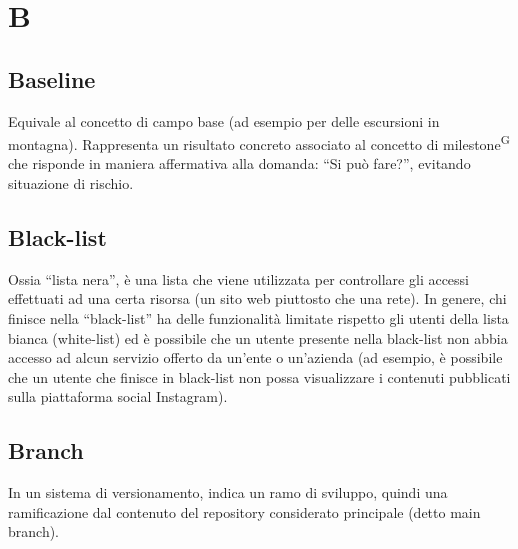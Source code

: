 \section{B}


\subsection{Baseline} 
Equivale al concetto di campo base (ad esempio per delle escursioni in montagna). Rappresenta un risultato concreto associato al concetto di milestone\textsuperscript{G} che risponde in maniera affermativa alla domanda: “Si può fare?”, evitando situazione di rischio.


\subsection{Black-list} Ossia “lista nera”, è una lista che viene utilizzata per controllare gli accessi effettuati ad una certa risorsa (un sito web piuttosto che una rete). In genere, chi finisce nella “black-list” ha delle funzionalità limitate rispetto gli utenti della lista bianca (white-list) ed è possibile che un utente presente nella black-list non abbia accesso ad alcun servizio offerto da un’ente o un’azienda (ad esempio, è possibile che un utente che finisce in black-list non possa visualizzare i contenuti pubblicati sulla piattaforma social Instagram). 



\subsection{Branch}
In un sistema di versionamento, indica un ramo di sviluppo, quindi una ramificazione dal contenuto del repository considerato principale (detto main branch). 


\clearpage